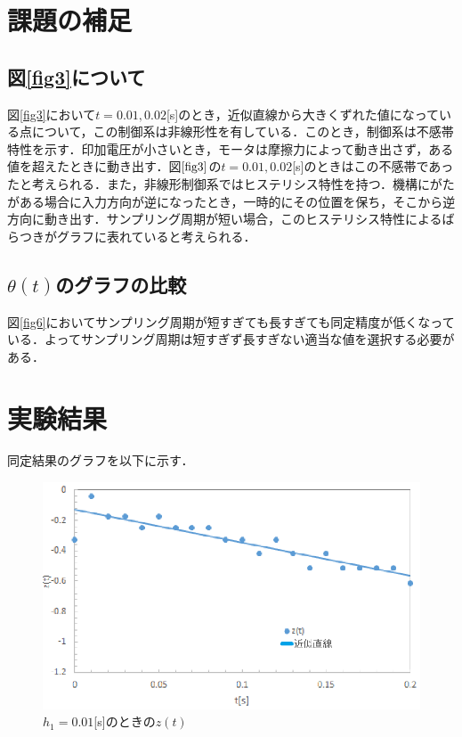 \documentclass[11pt,a4paper]{jsarticle}
\begin{document}
\setcounter{section}{6}
\section{課題の補足}
\subsection{図\ref{fig3}について}
図\ref{fig3}において$t = 0.01,0.02$[s]のとき，近似直線から大きくずれた値になっている点について，この制御系は非線形性を有している．このとき，制御系は不感帯特性を示す．印加電圧が小さいとき，モータは摩擦力によって動き出さず，ある値を超えたときに動き出す．図$\ref{fig3}$の$t = 0.01,0.02$[s]のときはこの不感帯であったと考えられる．また，非線形制御系ではヒステリシス特性を持つ．機構にがたがある場合に入力方向が逆になったとき，一時的にその位置を保ち，そこから逆方向に動き出す．サンプリング周期が短い場合，このヒステリシス特性によるばらつきがグラフに表れていると考えられる．

\subsection{$\theta(t)$のグラフの比較}
図\ref{fig6}においてサンプリング周期が短すぎても長すぎても同定精度が低くなっている．よってサンプリング周期は短すぎず長すぎない適当な値を選択する必要がある．


\newpage
\thispagestyle{fancy}
\cfoot{}

\setcounter{section}{3}
\section{実験結果}
同定結果のグラフを以下に示す．

\begin{figure}[htb]
 \begin{center}
  \includegraphics[scale = 1]{./picture/graph1_re2.eps}
 \end{center}
 \caption{$h_1 = 0.01$[s]のときの$z(t)$}
\end{figure}
\end{document}

